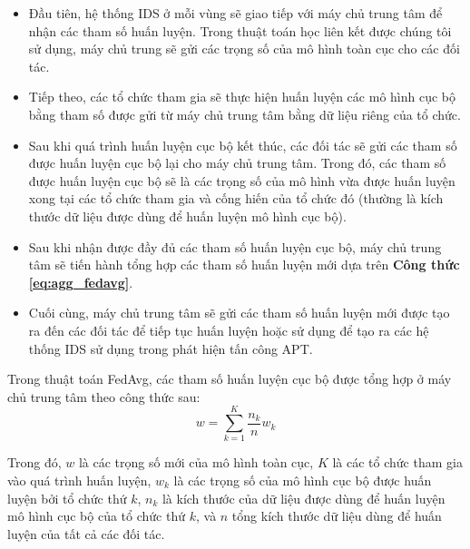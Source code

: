 \begin{itemize}
    \item Đầu tiên, hệ thống IDS ở mỗi vùng sẽ giao tiếp với máy chủ trung tâm để nhận các tham số huấn luyện. Trong thuật toán học liên kết được chúng tôi sử dụng, máy chủ trung sẽ gửi các trọng số của mô hình toàn cục cho các đối tác.
	
    \item Tiếp theo, các tổ chức tham gia sẽ thực hiện huấn luyện các mô hình cục bộ bằng tham số được gửi từ máy chủ trung tâm bằng dữ liệu riêng của tổ chức.
	
    \item Sau khi quá trình huấn luyện cục bộ kết thúc, các đối tác sẽ gửi các tham số được huấn luyện cục bộ lại cho máy chủ trung tâm. Trong đó, các tham số được huấn luyện cục bộ sẽ là các trọng số của mô hình vừa được huấn luyện xong tại các tổ chức tham gia và cống hiến của tổ chức đó (thường là kích thước dữ liệu được dùng để huấn luyện mô hình cục bộ).
	
    \item Sau khi nhận được đầy đủ các tham số huấn luyện cục bộ, máy chủ trung tâm sẽ tiến hành tổng hợp các tham số huấn luyện mới dựa trên \textbf{Công thức \ref{eq:agg_fedavg}}.
	
    \item Cuối cùng, máy chủ trung tâm sẽ gửi các tham số huấn luyện mới được tạo ra đến các đối tác để tiếp tục huấn luyện hoặc sử dụng để tạo ra các hệ thống IDS sử dụng trong phát hiện tấn công APT.
\end{itemize}

\bigbreak\noindent
Trong thuật toán FedAvg, các tham số huấn luyện cục bộ được tổng hợp ở máy chủ trung tâm theo công thức sau:
\begin{equation}
    w = \sum_{k=1}^{K} \frac{n_k}{n} w_k
    \label{eq:agg_fedavg}
\end{equation}

\bigbreak\noindent
Trong đó, $w$ là các trọng số mới của mô hình toàn cục, $K$ là các tổ chức tham gia vào quá trình huấn luyện, $w_k$ là các trọng số của mô hình cục bộ được huấn luyện bởi tổ chức thứ $k$, $n_k$ là kích thước của dữ liệu được dùng để huấn luyện mô hình cục bộ của tổ chức thứ $k$, và $n$ tổng kích thước dữ liệu dùng để huấn luyện của tất cả các đối tác.




